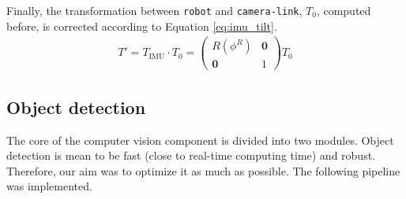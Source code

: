 Finally, the transformation between \texttt{robot} and \texttt{camera-link}, $T_0$, computed before, is corrected according to Equation \ref{eq:imu_tilt}.
\begin{align}
\label{eq:imu_tilt}
T' = T_{\text{IMU}} \cdot T_0 = 
\begin{pmatrix}
R(\phi^R) & \textbf{0}\\
\textbf{0} & 1 
\end{pmatrix} T_0
\end{align}

\subsection{Object detection}
The core of the computer vision component is divided into two modules. Object detection is mean to be fast (close to real-time computing time) and robust. Therefore, our aim was to optimize it as much as possible. The following pipeline was implemented.

